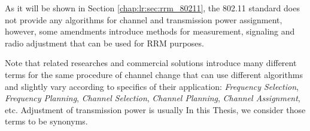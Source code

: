 As it will be shown in Section \ref{chap:lr:sec:rrm_80211}, the 802.11 standard does not provide any algorithms for channel and transmission power assignment, however, some amendments introduce methods for measurement, signaling and radio adjustment that can be used for RRM purposes.

Note that related researches and commercial solutions introduce many different terms for the same procedure of channel change that can use different algorithms and slightly vary according to specifics of their application: \textit{Frequency Selection}, \textit{Frequency Planning}, \textit{Channel Selection}, \textit{Channel Planning}, \textit{Channel Assignment}, etc. Adjustment of transmission power is usually
In this Thesis, we consider those terms to be synonyms.